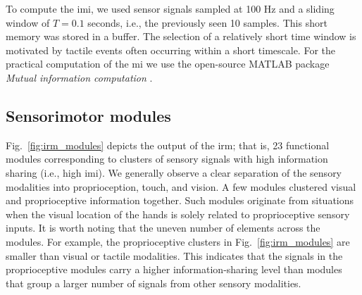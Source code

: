 To compute the \ac{imi}, we used sensor signals sampled at 100 Hz and a sliding window of $T = 0.1$ seconds, i.e., the previously seen 10 samples. This short memory was stored in a buffer. The selection of a relatively short time window is motivated by tactile events often occurring within a short timescale. For the practical computation of the \ac{mi}
we use the open-source MATLAB package \emph{Mutual information computation} \cite{PengMutualInformationcomputation}.


\subsection{Sensorimotor modules}
    
Fig.~\ref{fig:irm_modules} depicts the output of the \ac{irm}; that is, 23 functional modules corresponding to clusters of sensory signals with high information sharing (i.e., high \ac{imi}). We generally observe a clear separation of the sensory modalities into proprioception, touch, and vision. A few modules clustered visual and proprioceptive information together. Such modules originate from situations when the visual location of the hands is solely related to proprioceptive sensory inputs. It is worth noting that the uneven number of elements across the modules. For example, the proprioceptive clusters in Fig.~\ref{fig:irm_modules} are smaller than visual or tactile modalities. This indicates that the signals in the proprioceptive modules carry a higher information-sharing level than modules that group a larger number of signals from other sensory modalities.

